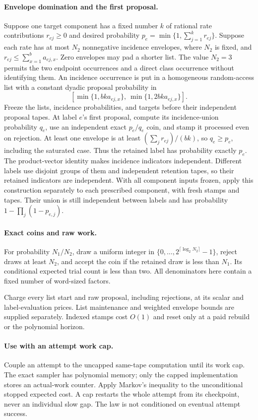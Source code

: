 \documentclass[11pt]{article}
\theoremstyle{remark}
\begin{document}
\paragraph{Envelope domination and the first proposal.}
Suppose one target component has a fixed number $k$ of rational rate
contributions $r_{ej}\ge0$ and desired probability $p_e=\min\{1,\sum_{j=1}^k
r_{ej}\}$.
Suppose each rate has at most $N_2$ nonnegative incidence envelopes, where $N_2$ is
fixed, and $r_{ej}\le\sum_{x=1}^b a_{ej,x}$.
Zero envelopes may pad a shorter list.
The value $N_2=3$ permits the two endpoint occurrences and a direct class
occurrence without identifying them.
An incidence occurrence is put in a homogeneous random-access list with a
constant dyadic proposal probability in
\[
 [\min\{1,bk a_{ej,x}\},\ \min\{1,2bk a_{ej,x}\}].
\]
Freeze the lists, incidence probabilities, and targets before their independent
proposal tapes.
At label $e$'s first proposal, compute its incidence-union probability $q_e$,
use an independent exact $p_e/q_e$ coin, and stamp it processed even on
rejection.
At least one envelope is at least $(\sum_jr_{ej})/(bk)$, so $q_e\ge p_e$,
including the saturated case.
Thus the retained label has probability exactly $p_e$.
The product-vector identity makes incidence indicators independent.
Different labels use disjoint groups of them and independent retention tapes, so
their retained indicators are independent.
With all component inputs frozen, apply this construction separately to each
prescribed component, with fresh stamps and tapes.
Their union is still independent between labels and has probability
$1-\prod_j(1-p_{e,j})$.

\paragraph{Exact coins and raw work.}
For probability $N_1/N_2$, draw a uniform integer in
$\{0,\ldots,2^{\lceil\log_2N_2\rceil}-1\}$, reject draws at least $N_2$, and accept
the coin if the retained draw is less than $N_1$.
Its conditional expected trial count is less than two.
All denominators here contain a fixed number of word-sized factors.

Charge every list start and raw proposal, including rejections, at its scalar
and label-evaluation prices.
List maintenance and weighted envelope bounds are supplied separately.
Indexed stamps cost $O(1)$ and reset only at a paid rebuild or the polynomial
horizon.

\paragraph{Use with an attempt work cap.}
Couple an attempt to the uncapped same-tape computation until its work cap.
The exact sampler has polynomial memory; only the capped implementation stores
an actual-work counter.
Apply Markov's inequality to the unconditional stopped expected cost.
A cap restarts the whole attempt from its checkpoint, never an individual slow
gap.
The law is not conditioned on eventual attempt success.
\end{document}
